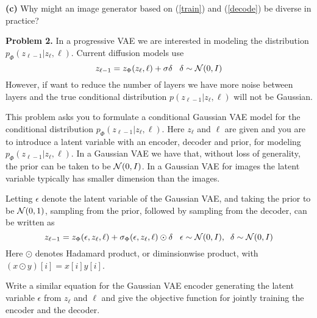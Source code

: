 \documentclass{article}
\newcommand{\solution}[1]{}
\begin{document}
\medskip
{\bf (c)} Why might an image generator based on (\ref{train}) and (\ref{decode}) be diverse in practice?

\solution{
  The universality assumption does not hold in practice and hence we should not expect $z_{\ell-1}(z_L,L)$ to be truly constant independent of $z_L$.  This variation
  can be amplified through the decoding process.}

\bigskip

{\bf Problem 2.} In a progressive VAE we are interested in modeling the distribution $p_\Phi(z_{\ell-1}|z_\ell,\ell)$.  Current
diffusion models use
$$z_{\ell-1} = z_\Phi(z_\ell,\ell) + \sigma\delta\;\;\;\delta \sim {\cal N}(0,I)$$
However, if want to reduce the number of layers we have more noise between layers and the true conditional distribution $p(z_{\ell-1}|z_\ell,\ell)$ will not be Gaussian.

\medskip
This problem asks you to formulate a conditional Gaussian VAE model for the conditional distribution $p_\Phi(z_{\ell-1}|z_\ell,\ell)$.
Here $z_\ell$ and $\ell$ are given and you are to introduce a latent variable with an encoder, decoder and prior, for modeling
$p_\Phi(z_{\ell-1}|z_\ell,\ell)$.  In a Gaussian VAE we have that, without loss of generality, the prior can be taken to be ${\cal N}(0,I)$.
In a Gaussian VAE for images the latent variable typically has smaller dimension than the images.

\medskip
Letting $\epsilon$ denote the latent variable of the Gaussian VAE, and taking the prior to be ${\cal N}(0,1)$, sampling from the prior, followed by sampling from the decoder, can be written as
$$z_{\ell-1} = z_\Phi(\epsilon,z_\ell,\ell) + \sigma_\Phi(\epsilon,z_\ell,\ell)\odot\delta\;\;\;\epsilon \sim {\cal N}(0,I), \;\;\delta \sim {\cal N}(0,I)$$
Here $\odot$ denotes Hadamard product, or diminsionwise product, with $(x \odot y)[i] = x[i]y[i]$.

\medskip
Write a similar equation for the Gaussian VAE encoder generating the latent variable $\epsilon$ from $z_\ell$ and $\ell$ and give the objective function for jointly training the encoder and the decoder.

\solution{
For encoding the latent variable $\epsilon$ we introduce a model
$$\epsilon = \epsilon_\Psi(z_{\ell-1},z_\ell,\ell) + \sigma_\Psi(z_{\ell-1},z_\ell,\ell) \odot \gamma\;\;\;\gamma \sim {\cal N}(0,I)$$
The training objective is then
$$\Phi^*,\Psi^* = \argmin_{\Phi,\Psi} \;E_{y,\ell,z_{\ell-1},z_\ell,\epsilon}\;\;KL(p_\Psi(\epsilon|z_{\ell-1},z_\ell,\ell),{\cal N}(0,I)) - \ln p_\Phi(z_{\ell-1}|\epsilon,z_\ell,\ell)$$

\medskip
There are various equivalent ways of writing this which also get full credit.
}
\end{document}
